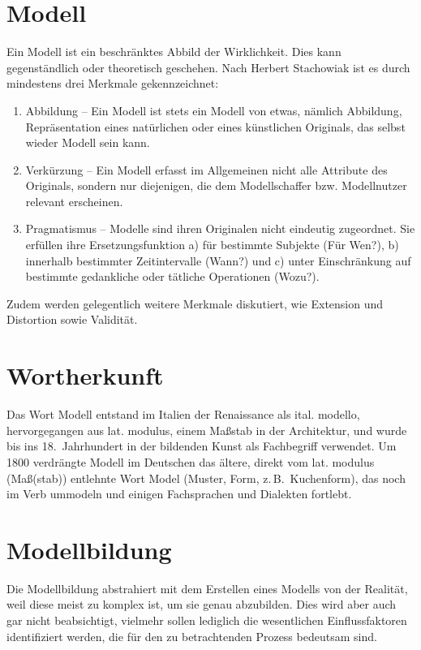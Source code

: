 \documentclass[a4paper, 12pt, pagesize]{scrartcl}
\begin{document}
\section{Modell}
Ein Modell ist ein beschränktes Abbild der Wirklichkeit. Dies kann gegenständlich oder theoretisch geschehen. Nach Herbert Stachowiak ist es durch mindestens drei Merkmale gekennzeichnet:
\begin{enumerate}
    \item Abbildung – Ein Modell ist stets ein Modell von etwas, nämlich Abbildung, Repräsentation eines natürlichen oder eines künstlichen Originals, das selbst wieder Modell sein kann.
    \item Verkürzung – Ein Modell erfasst im Allgemeinen nicht alle Attribute des Originals, sondern nur diejenigen, die dem Modellschaffer bzw. Modellnutzer relevant erscheinen.
    \item Pragmatismus – Modelle sind ihren Originalen nicht eindeutig zugeordnet. Sie erfüllen ihre Ersetzungsfunktion a) für bestimmte Subjekte (Für Wen?), b) innerhalb bestimmter Zeitintervalle (Wann?) und c) unter Einschränkung auf bestimmte gedankliche oder tätliche Operationen (Wozu?).
\end{enumerate}

Zudem werden gelegentlich weitere Merkmale diskutiert, wie Extension und Distortion sowie Validität.

\tableofcontents

\section{Wortherkunft}

Das Wort Modell entstand im Italien der Renaissance als ital. modello, hervorgegangen aus lat. modulus, einem Maßstab in der Architektur, und wurde bis ins 18.\ Jahrhundert in der bildenden Kunst als Fachbegriff verwendet. Um 1800 verdrängte Modell im Deutschen das ältere, direkt vom lat. modulus (Maß(stab)) entlehnte Wort Model (Muster, Form, z.\,B.\ Kuchenform), das noch im Verb ummodeln und einigen Fachsprachen und Dialekten fortlebt.

\section{Modellbildung}

Die Modellbildung abstrahiert mit dem Erstellen eines Modells von der Realität, weil diese meist zu komplex ist, um sie genau abzubilden. Dies wird aber auch gar nicht beabsichtigt, vielmehr sollen lediglich die wesentlichen Einflussfaktoren identifiziert werden, die für den zu betrachtenden Prozess bedeutsam sind.
\end{document}
